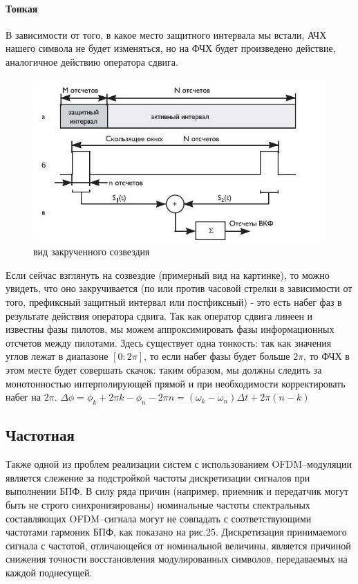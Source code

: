 \paragraph {Тонкая}
В зависимости от того, в какое место защитного интервала мы встали, АЧХ нашего символа не будет изменяться, но на ФЧХ будет произведено действие, аналогичное  действию оператора сдвига.
\begin{figure}[!h]
\includegraphics{correl}
\caption{вид закрученного созвездия}
\end{figure}
Если сейчас  взглянуть на созвездие (примерный вид на картинке), то можно увидеть, что оно закручивается (по или против часовой стрелки в зависимости от того, префиксный защитный интервал или постфиксный) - это есть набег фаз в результате действия оператора сдвига. Так как оператор сдвига линеен и известны фазы пилотов, мы можем аппроксимировать фазы информационных отсчетов между пилотами. 
Здесь существует одна тонкость: так как значения углов лежат в диапазоне $[0:2 \pi]$, то если набег фазы будет больше $2\pi$, то ФЧХ в этом месте будет совершать скачок: таким образом, мы должны следить за монотонностью интерполирующей прямой и при необходимости корректировать набег на $2\pi$. 
$\Delta \phi = \phi_k + 2\pi k - \phi_n-2\pi n = (\omega_k - \omega_n)\Delta t+ 2\pi (n-k)$

\subsection {Частотная}
Также одной из проблем реализации систем с использованием OFDM--модуляции является слежение за подстройкой частоты дискретизации сигналов при выполнении БПФ. В силу ряда причин (например,  приемник и передатчик могут быть не строго синхронизированы) номинальные частоты спектральных составляющих OFDM--сигнала могут не совпадать с соответствующими частотами гармоник БПФ, как показано на рис.25. Дискретизация принимаемого сигнала с частотой, отличающейся от номинальной величины, является причиной снижения точности восстановления модулированных символов, передаваемых на каждой поднесущей.

